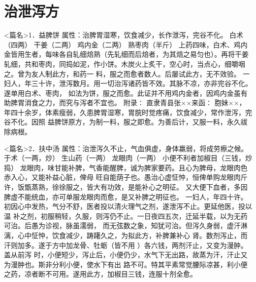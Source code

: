 \documentclass[a4paper,12pt,UTF8,twoside]{ctexbook}
\begin{document}
\chapter{治泄泻方}
<篇名>1．益脾饼
属性：治脾胃湿寒，饮食减少，长作泄泻，完谷不化。 
白术（四两） 干姜（二两） 鸡内金（二两） 熟枣肉（半斤） 
上药四味，白术、鸡内金皆用生者，每味各自轧细焙熟（先轧细而后焙者，为其焙之易匀也）。再将干姜 
轧细，共和枣肉，同捣如泥，作小饼。木炭火上炙干，空心时，当点心，细嚼咽之。曾为友人制此方，和药一 
料，服之而愈者数人。后屡试此方，无不效验。 
一妇人，年三十许，泄泻数月。用一切治泻诸药皆不效。其脉不凉，亦非完谷不化。遂单用白术、枣肉， 
如法为饼，服之而愈。此证并不用鸡内金者，因鸡内金虽有助脾胃消食之力，而究与泻者不宜也。 
附录∶ 
直隶青县张××来函∶ 
胞妹××，年四十余岁，体素瘦弱，久患脾胃湿寒，胃脘时觉疼痛，饮食减少，常作泄泻，完谷不化。因照 
益脾饼原方，为制一料，服之即愈。为善后计，又服一料，永久祓除病根。 


<篇名>2．扶中汤
属性：治泄泻久不止，气血俱虚，身体羸弱，将成劳瘵之候。 
于术（一两，炒） 生山药（一两） 龙眼肉（一两） 
小便不利者加椒目（三钱，炒捣） 
龙眼肉，味甘能补脾，气香能醒脾，诚为脾家要药。且心为脾母，龙眼肉色赤入心，又能补益心脏，俾母 
旺自能荫子也。愚治心虚怔忡，恒俾单购龙眼肉斤许，饭甑蒸熟，徐徐服之，皆大有功效，是能补心之明征。 
又大便下血者，多因脾虚不能统血，亦可单服龙眼肉而愈，是又补脾之明征也。 
一妇人，年四十许。初因心中发热，气分不舒，医者投以清火理气之剂，遂泄泻不止。更延他医，投以温 
补之剂，初服稍轻，久服，则泻仍不止。一日夜四五次，迁延半载，以为无药可治。后愚为诊视，脉虽濡弱， 
而无弦数之象，知犹可治。但泻久身弱，虚汗淋漓，心中怔忡，饮食减少，踌躇久之，为拟此方，补脾兼补心 
肾。数剂泻止，而汗则加多。遂于方中加龙骨、牡蛎（皆不用 ）各六钱，两剂汗止，又变为漫肿。盖从前泻 
时，小便短少，泻止后，小便仍少，水气下无出路，故蒸为汗，汗止又为漫肿也。斯非分利小便，使水下有出 
路不可。特其平素常觉腰际凉甚，利小便之药，凉者断不可用。遂用此方，加椒目三钱，连服十剂全愈。 
\end{document}
